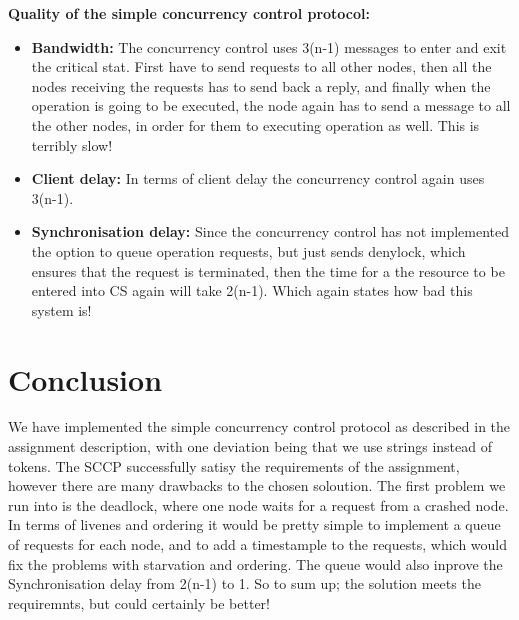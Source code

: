 \textbf{Quality of the simple concurrency control protocol:}
\begin{itemize}
\item \textbf{Bandwidth:} The concurrency control uses 3(n-1) messages to enter and exit the critical stat. First have to send requests to all other nodes, then all the nodes receiving the requests has to send back a reply, and finally when the operation is going to be executed, the node again has to send a message to all the other nodes, in order for them to executing operation as well. This is terribly slow!
\item \textbf{Client delay:} In terms of client delay the concurrency control again uses 3(n-1).
\item \textbf{Synchronisation delay:} Since the concurrency control has not implemented the option to queue operation requests, but just sends denylock, which ensures that the request is terminated, then the time for a the resource to be entered into CS again will take 2(n-1). Which again states how bad this system is!
\end{itemize}

\section{Conclusion}
\label{MutualExclusion_conclusion}
We have implemented the simple concurrency control protocol as described in the assignment description, with one deviation being that we use strings instead of tokens. The SCCP successfully satisy the requirements of the assignment, however there are many drawbacks to the chosen soloution. The first problem we run into is the deadlock, where one node waits for a request from a crashed node. In terms of livenes and ordering it would be pretty simple to implement a queue of requests for each node, and to add a timestample to the requests, which would fix the problems with starvation and ordering. The queue would also inprove the Synchronisation delay from 2(n-1) to 1.
So to sum up; the solution meets the requiremnts, but could certainly be better!
